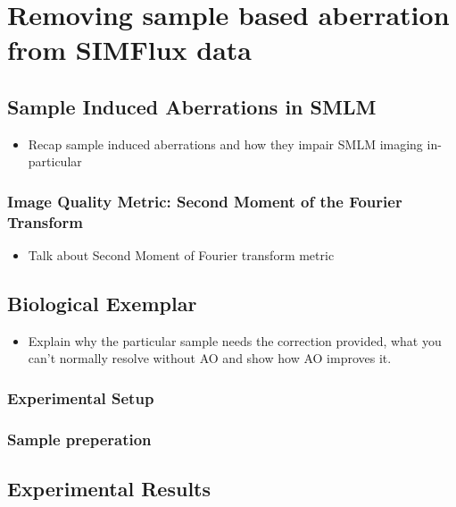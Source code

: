 \chapter{Removing sample based aberration from SIMFlux data}

\section{Sample Induced Aberrations in SMLM}
\label{sec:sample_aberrations_SMLM}

\begin{itemize}
	\item Recap sample induced aberrations and how they impair SMLM imaging in-particular
\end{itemize}

	\subsection{Image Quality Metric: Second Moment of the Fourier Transform}
	\label{sec:second_moment_metric}
	
	\begin{itemize}
		\item Talk about Second Moment of Fourier transform metric
	\end{itemize}

\section{Biological Exemplar}
\label{sec:SIMFlux_biology}

\begin{itemize}
	\item Explain why the particular sample needs the correction provided, what you can't normally resolve without AO and show how  AO improves it.
\end{itemize}

	\subsection{Experimental Setup}
	\label{subsec:SIMFlux_setup}

	\subsection{Sample preperation}
	\label{subsec:SIMFlux_sample_prep}
	
\section{Experimental Results}
\label{sec:SIMFlux_results}